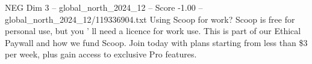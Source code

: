 \begin{textsample}{NEG Dim 3 – global\_north\_2024\_12 – Score -1.00 – global\_north\_2024\_12/119336904.txt}
Using Scoop for work?
Scoop is free for personal use, but you ' ll need a licence for work use.
This is part of our Ethical Paywall and how we fund Scoop.
Join today with plans starting from less than \$3 per week, plus gain access to exclusive Pro features.

\end{textsample}
